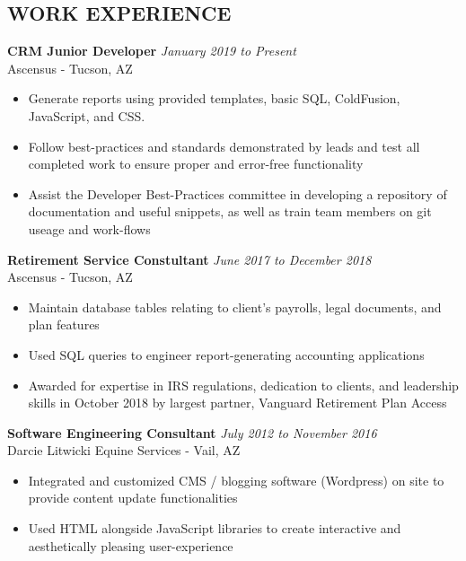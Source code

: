 \documentclass[11pt]{res} %
\begin{document}
 
 
\address{Tucson, AZ $|$ xmclallen@gmail.com $|$ (910) 916-0948}        
         
                        
\begin{resume}                         

\section{WORK EXPERIENCE}
\vspace{4pt}
  {\bf CRM Junior Developer} \hfill  {\sl January 2019 to Present}\\
  Ascensus - Tucson, AZ
  
   \begin{itemize} %
   \item Generate reports using provided templates, basic SQL, ColdFusion, JavaScript, and CSS.
   \item Follow best-practices and standards demonstrated by leads and test all completed work to ensure proper and error-free functionality
   \item Assist the Developer Best-Practices committee in developing a repository of documentation and useful snippets, as well as train team members on git useage and work-flows
   \end{itemize}


  {\bf Retirement Service Constultant} \hfill  {\sl June 2017 to December 2018}\\
  Ascensus - Tucson, AZ
  
   \begin{itemize} %
   \item Maintain database tables relating to client’s payrolls, legal documents, and plan features
   \item Used SQL queries to engineer report-generating accounting applications
   \item Awarded for expertise in IRS regulations, dedication to clients, and leadership skills in October 2018 by largest partner, Vanguard Retirement Plan Access
   \end{itemize}


  {\bf Software Engineering Consultant} \hfill  {\sl July 2012 to November 2016}\\
  Darcie Litwicki Equine Services - Vail, AZ
  
   \begin{itemize} %
   \item Integrated and customized CMS / blogging software (Wordpress) on site to provide content update functionalities
   \item Used HTML alongside JavaScript libraries to create interactive and aesthetically pleasing user-experience
   \end{itemize}
   

\end{resume}
\end{document}
